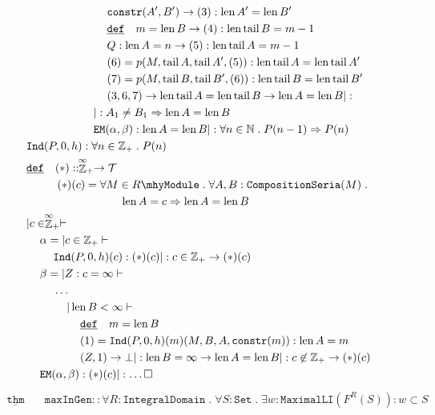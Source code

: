 \documentclass[12pt]{article}
\DeclareMathOperator*{\len}{\mathrm{len}}
\DeclareMathOperator*{\tail}{\mathrm{tail}}
\renewcommand{\.}{\; . \;}
\newcommand\scard{\stackrel{\mathclap{\infty}}{\mathbb{Z}}_+}
\newcommand{\De}{\underline{\mathtt{def}} \quad}
\newcommand{\Thm}{\underline{\mathtt{thm}} \quad}
\newcommand{\module}[1]{{#1} \mhy \mathtt{Module}}
\newcommand{\set}{\mathtt{Set}}
\newcommand{\maxLInd}{\mathtt{MaximalLI}}
\newcommand{\intD}{\mathtt{IntegralDomain}}
\newcommand{\comps}{\mathtt{CompositionSeria}}
\newcommand{\context}{\vdash}
\begin{document}
\newpage
\begin{align*}
\\& \kern 6pc  \mathtt{constr}(A',B') \to (3): \len A' = \len B' 
\\& \kern 6pc \De m = \len B \to (4) : \len \tail B = m -1 
\\&  \kern 6pc Q : \len A = n \to (5) : \len \tail A = m - 1
\\&  \kern 6pc (6) =  p(M,\tail A, \tail A', (5)) : \len \tail A = \len \tail A' 
\\&  \kern 6pc (7) =   p(M,\tail B, \tail B', (6)) : \len  \tail B = \len \tail B'
\\& \kern 6pc (3,6,7) \to  \len \tail A = \len \tail B \to \len A = \len B |: 
\\& \kern 5pc | : A_1 \neq B_1 \Rightarrow  \len A = \len B  
\\& \kern 5pc \mathtt{EM}(\alpha,\beta) :  \len A = \len B | 
: \forall n \in \mathbb{N} \.  P(n -1) \Rightarrow P(n)
\\&  \mathtt{Ind}(P,0,h) : \forall n \in \mathbb{Z}_+ \. P(n)
\\&  \De  (*) ::  \scard \to \mathcal{T}
\\&  \kern 2.3pc (*)(c) = \forall M \in \module{R} \. \forall A,B : \comps(M) \.
\\&  \kern 7pc    \len A = c \Rightarrow \len A = \len B 
\\& | c \in \scard \context
\\&  \kern 1pc \alpha =  |c \in \mathbb{Z}_+ \context
\\& \kern 2pc \mathtt{Ind}(P,0,h)(c) : (*)(c) | : c \in \mathbb{Z}_+ \to (*)(c)
\\& \kern 1pc \beta = | Z : c = \infty \context
\\& \kern 2pc \ldots
\\& \kern 3pc | \len B < \infty \context
\\& \kern 4pc  \De m = \len B
\\& \kern 4pc (1) = \mathtt{Ind}(P,0,h)(m)(M,B,A, \mathtt{constr}(m)) : \len A = m
\\& \kern 4pc (Z, 1) \to \bot | : \len B = \infty \to \len A = \len B  | : 
c \not \in \mathbb{Z}_+ \to (*)(c)
\\& \kern 1pc \mathtt{EM}(\alpha,\beta) : (*)(c) | : \ldots \square  
\end{align*}
\newpage
\begin{align*}
\Thm & \mathtt{maxInGen} :: \forall R : \intD \. \forall S : \set \. \exists w :
	\maxLInd(F^R(S)) :  w \subset S \\
\end{align*} 
\newpage
\end{document}
